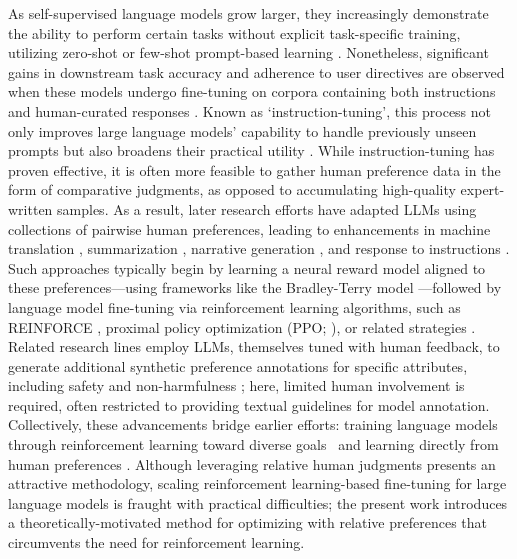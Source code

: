 As self-supervised language models grow larger, they increasingly demonstrate the ability to perform certain tasks without explicit task-specific training, utilizing zero-shot \citep{radford2019language} or few-shot prompt-based learning \citep{gpt3,megatron,chowdhery2022palm}. Nonetheless, significant gains in downstream task accuracy and adherence to user directives are observed when these models undergo fine-tuning on corpora containing both instructions and human-curated responses \citep{mishra-etal-2022-cross,sanh2022multitask,chung2022scaling,thoppilan2022lamda}. Known as `instruction-tuning', this process not only improves large language models’ capability to handle previously unseen prompts but also broadens their practical utility \citep{chung2022scaling}. While instruction-tuning has proven effective, it is often more feasible to gather human preference data in the form of comparative judgments, as opposed to accumulating high-quality expert-written samples. As a result, later research efforts have adapted LLMs using collections of pairwise human preferences, leading to enhancements in machine translation \citep{kreutzer-etal-2018-reliability}, summarization \citep{stiennon2022learning,ziegler2020finetuning}, narrative generation \citep{ziegler2020finetuning}, and response to instructions \citep{ouyang2022training,ramamurthy2023is}. Such approaches typically begin by learning a neural reward model aligned to these preferences—using frameworks like the Bradley-Terry model \citep{bradley1952rankanalysis}—followed by language model fine-tuning via reinforcement learning algorithms, such as REINFORCE \citep{williams1992reinforce}, proximal policy optimization (PPO; \cite{schulman2017proximal}), or related strategies \citep{ramamurthy2023is}. Related research lines employ LLMs, themselves tuned with human feedback, to generate additional synthetic preference annotations for specific attributes, including safety and non-harmfulness \citep{bai2022constitutional}; here, limited human involvement is required, often restricted to providing textual guidelines for model annotation. Collectively, these advancements bridge earlier efforts: training language models through reinforcement learning toward diverse goals~\citep{Ranzato2015SequenceLT,paulus2018a,wu2018learning} and learning directly from human preferences \citep{christiano2017deep,kupcsik2018learning}. Although leveraging relative human judgments presents an attractive methodology, scaling reinforcement learning-based fine-tuning for large language models is fraught with practical difficulties; the present work introduces a theoretically-motivated method for optimizing with relative preferences that circumvents the need for reinforcement learning.

